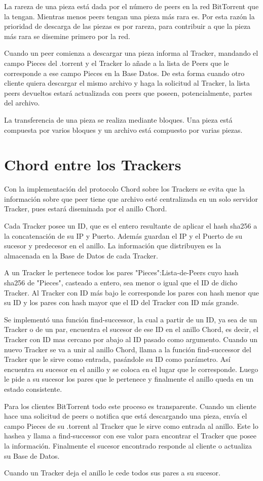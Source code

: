 \documentclass[article]{llncs}
\begin{document}
La rareza de una pieza está dada por el número de peers en la red BitTorrent que la tengan. Mientras menos peers 
tengan una pieza más rara es. Por esta razón la prioridad de descarga de las piezas es por rareza, para contribuir a que 
la pieza más rara se disemine primero por la red.

Cuando un peer comienza a descargar una pieza informa al Tracker, mandando el campo Pieces del .torrent y el Tracker 
lo añade a la lista de Peers que le corresponde a ese campo Pieces en la Base Datos. De esta forma cuando otro cliente 
quiera descargar el mismo archivo y haga la solicitud al Tracker, la lista peers devueltos estará actualizada con peers 
que poseen, potencialmente, partes del archivo.

La transferencia de una pieza se realiza mediante bloques. Una pieza está compuesta por varios bloques y un archivo está 
compuesto por varias piezas.

\section{Chord entre los Trackers}  
Con la implementación del protocolo Chord sobre los Trackers se evita que la información sobre que peer tiene que archivo 
esté centralizada en un solo servidor Tracker, pues estará diseminada por el anillo Chord. 

Cada Tracker posee un ID, que es el entero resultante de aplicar el hash sha256 a la concatenación de su IP y Puerto.
Además guardan el IP y el Puerto de su sucesor y predecesor en el anillo. La información que distribuyen es la almacenada 
en la Base de Datos de cada Tracker.

A un Tracker le pertenece todos los pares "Pieces":Lista-de-Peers cuyo hash sha256 de "Pieces", casteado a entero, sea 
menor o igual que el ID de dicho Tracker. Al Tracker con ID más bajo le corresponde los pares con hash menor que su ID 
y los pares con hash mayor que el ID del Tracker con ID más grande.

Se implementó una función find-successor, la cual a partir de un ID, ya sea de un Tracker o de un par, encuentra el sucesor 
de ese ID en el anillo Chord, es decir, el Tracker con ID mas cercano por abajo al ID pasado como argumento. Cuando un nuevo 
Tracker se va a unir al anillo Chord, llama a la función find-successor del Tracker que le sirve como entrada, pasándole su ID 
como parámetro. Así encuentra su sucesor en el anillo y se coloca en el lugar que le corresponde. Luego le pide a su 
sucesor los pares que le pertenece y finalmente el anillo queda en un estado consistente.

Para los clientes BitTorrent todo este proceso es transparente. Cuando un cliente hace una solicitud de peers o notifica 
que está descargando una pieza, envía el campo Pieces de su .torrent al Tracker que le sirve como entrada al anillo. Este 
lo hashea y llama a find-successor con ese valor para encontrar el Tracker que posee la información. Finalmente el sucesor 
encontrado responde al cliente o actualiza su Base de Datos.

Cuando un Tracker deja el anillo le cede todos sus pares a su sucesor.
\end{document}
